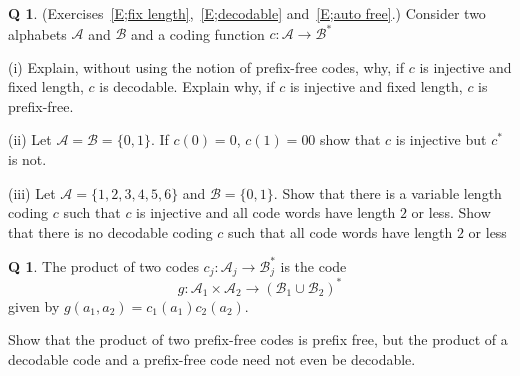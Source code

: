 \documentclass[12pt,a4paper]{article}
\theoremstyle{plain}
\theoremstyle{definition}
\newtheorem{question}[theorem]{Q}
\begin{document}
    \begin{question}
        \label{C1.2}
        (Exercises~\ref{E;fix length},~\ref{E;decodable}
        and~\ref{E;auto free}.)
        Consider two alphabets ${\mathcal A}$
        and ${\mathcal B}$
        and a coding function $c:{\mathcal A}\rightarrow{\mathcal B}^{*}$

        (i) Explain, without using the notion of prefix-free
        codes, why, if $c$ is injective
        and fixed length, $c$
        is decodable. Explain why, if $c$ is injective
        and fixed length, $c$
        is prefix-free.

        (ii) Let ${\mathcal A}={\mathcal B}=\{0,1\}$. If
        $c(0)=0$, $c(1)=00$ show that $c$ is injective but $c^{*}$ is not.

        (iii) Let ${\mathcal A}=\{1,2,3,4,5,6\}$ and ${\mathcal B}=\{0,1\}$.
        Show that there is a variable length coding $c$ such that
        $c$ is injective and all code words have length $2$ or less.
        Show that there is no decodable coding $c$ such that
        all code words have length $2$ or less
    \end{question}
    \begin{question}
        \label{C1.3} The product of two codes
        $c_{j}:{\mathcal A}_{j}\rightarrow{\mathcal B}^{*}_{j}$
        is the code
        \[g:{\mathcal A}_{1}\times{\mathcal A}_{2}
        \rightarrow({\mathcal B}_{1}\cup{\mathcal B}_{2})^{*}\]
        given by
        $g(a_{1},a_{2})=c_{1}(a_{1})c_{2}(a_{2})$.

        Show that the product of two prefix-free codes is prefix
        free, but the product of a decodable code and a prefix-free
        code need not even be decodable.
    \end{question}
\end{document}
